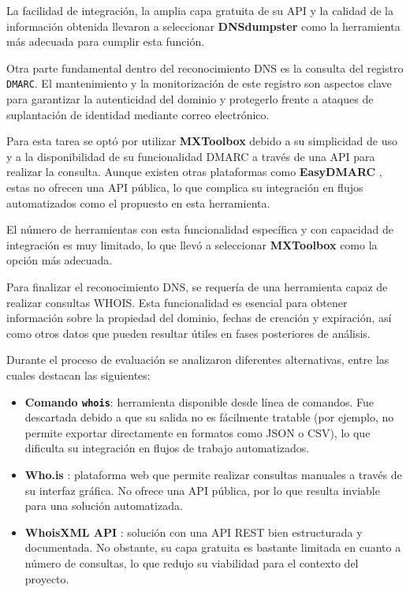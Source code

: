 \begin{parskipenv}
La facilidad de integración, la amplia capa gratuita de su API y la calidad de la información obtenida llevaron a seleccionar \textbf{DNSdumpster} como la herramienta más adecuada para cumplir esta función.

Otra parte fundamental dentro del reconocimiento DNS es la consulta del registro \texttt{DMARC}. El mantenimiento y la monitorización de este registro son aspectos clave para garantizar la autenticidad del dominio y protegerlo frente a ataques de suplantación de identidad mediante correo electrónico.

Para esta tarea se optó por utilizar \textbf{MXToolbox} debido a su simplicidad de uso y a la disponibilidad de su funcionalidad DMARC a través de una API para realizar la consulta. Aunque existen otras plataformas como \textbf{EasyDMARC} \cite{easydmarc}, estas no ofrecen una API pública, lo que complica su integración en flujos automatizados como el propuesto en esta herramienta.

El número de herramientas con esta funcionalidad específica y con capacidad de integración es muy limitado, lo que llevó a seleccionar \textbf{MXToolbox} como la opción más adecuada.

Para finalizar el reconocimiento DNS, se requería de una herramienta capaz de realizar consultas WHOIS. Esta funcionalidad es esencial para obtener información sobre la propiedad del dominio, fechas de creación y expiración, así como otros datos que pueden resultar útiles en fases posteriores de análisis.

Durante el proceso de evaluación se analizaron diferentes alternativas, entre las cuales destacan las siguientes:

\begin{itemize}
    \item \textbf{Comando \texttt{whois}}: herramienta disponible desde línea de comandos. Fue descartada debido a que su salida no es fácilmente tratable (por ejemplo, no permite exportar directamente en formatos como JSON o CSV), lo que dificulta su integración en flujos de trabajo automatizados.

    \item \textbf{Who.is} \cite{whoisweb}: plataforma web que permite realizar consultas manuales a través de su interfaz gráfica. No ofrece una API pública, por lo que resulta inviable para una solución automatizada.

    \item \textbf{WhoisXML API} \cite{whoisxmlapi}: solución con una API REST bien estructurada y documentada. No obstante, su capa gratuita es bastante limitada en cuanto a número de consultas, lo que redujo su viabilidad para el contexto del proyecto.
\end{itemize}


\end{parskipenv}
